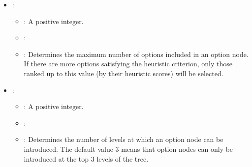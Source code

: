 \begin{itemize}
    \item {}:
           \begin{itemize}
                \item \optionPossibleValues{}: A positive integer.
                \item \optionDefaultValue{}: 
                \item \optionDescrption{}: Determines the maximum number of options included in an option node. If there are more options satisfying the heuristic criterion, only those ranked up to this value (by their heuristic scores) will be selected.
           \end{itemize}
    \item {}:
           \begin{itemize}
                \item \optionPossibleValues{}: A positive integer.
                \item \optionDefaultValue{}: 
                \item \optionDescrption{}: Determines the number of levels at which an option node can be introduced. The default value 3 means that option nodes can only be introduced at the top 3 levels of the tree.
           \end{itemize}
\end{itemize}
